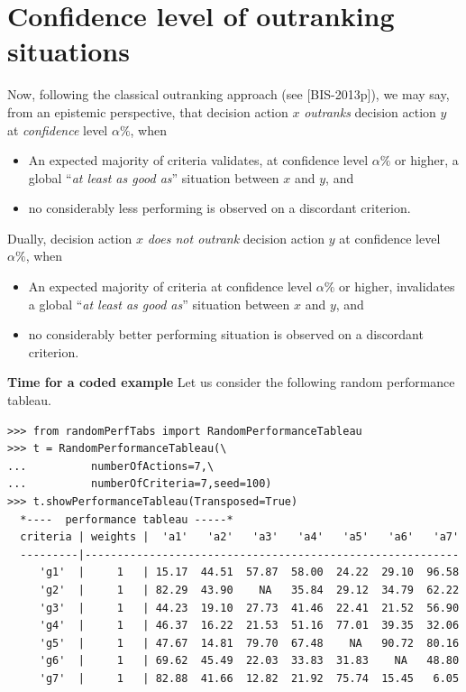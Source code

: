 \section{Confidence level of outranking situations}
\label{sec:18.3}

Now, following the classical outranking approach (see [BIS-2013p]), we may say, from an epistemic perspective, that decision action $x$ \emph{outranks} decision action $y$ at \emph{confidence} level $\alpha \%$, when
\begin{itemize}
\item An expected majority of criteria validates, at confidence level $\alpha \%$ or higher, a global ``\emph{at least as good as}'' situation between $x$ and $y$, and
\item no considerably less performing is observed on a discordant criterion.
\end{itemize}
Dually, decision action $x$ \emph{does not outrank} decision action $y$ at
confidence level $\alpha \%$, when
\begin{itemize}
\item An expected majority of criteria at confidence level $\alpha \%$ or higher, invalidates a global ``\emph{at least as good as}'' situation between $x$ and $y$, and
\item no considerably better performing situation is observed on a discordant criterion.
\end{itemize}

\noindent \textbf{Time for a coded example}
Let us consider the following random performance tableau.
\begin{lstlisting}[basicstyle=\scriptsize]
>>> from randomPerfTabs import RandomPerformanceTableau
>>> t = RandomPerformanceTableau(\
...          numberOfActions=7,\
...          numberOfCriteria=7,seed=100)
>>> t.showPerformanceTableau(Transposed=True)
  *----  performance tableau -----*
  criteria | weights |  'a1'   'a2'   'a3'   'a4'   'a5'   'a6'   'a7'   
  ---------|----------------------------------------------------------
     'g1'  |     1   | 15.17  44.51  57.87  58.00  24.22  29.10  96.58  
     'g2'  |     1   | 82.29  43.90    NA   35.84  29.12  34.79  62.22  
     'g3'  |     1   | 44.23  19.10  27.73  41.46  22.41  21.52  56.90  
     'g4'  |     1   | 46.37  16.22  21.53  51.16  77.01  39.35  32.06  
     'g5'  |     1   | 47.67  14.81  79.70  67.48    NA   90.72  80.16  
     'g6'  |     1   | 69.62  45.49  22.03  33.83  31.83    NA   48.80  
     'g7'  |     1   | 82.88  41.66  12.82  21.92  75.74  15.45   6.05  
\end{lstlisting}


